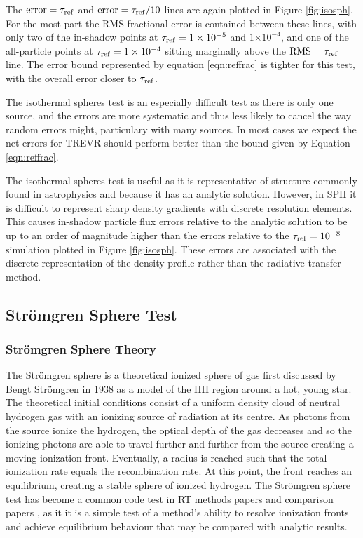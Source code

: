 \documentclass[fleq,usenatbib]{mnras}
\newcommand{\acro}{TREVR}
\providecommand{\e}[1]{\ensuremath{\times10^{#1}}}
\newcommand{\tr}{\tau_{\rm ref}}
\newcommand{\strom}{Str\"omgren}
\begin{document}
{The $\rm{error}=\tr$ and $\rm{error}=\tr/10$ lines are again plotted in Figure 
\ref{fig:isosph}. For the most part the RMS fractional error is contained 
between these lines, with only two of the in-shadow points at $\tr=1\e{-5}$ 
and $1\e{-4}$,  and one of the all-particle points at  $\tr=1\e{-4}$ sitting 
marginally above the $\rm{RMS}=\tr$ line.  The error bound represented by
equation 
\ref{eqn:reffrac} is tighter for this test, with the overall error
closer to $\tr$.

The isothermal spheres test is an especially difficult test as there 
is only one source, and the errors are more systematic and thus less likely
to cancel the way random errors might, particulary with many sources.
In most cases we expect the net errors for \acro{} should perform better than the bound
given by Equation \ref{eqn:reffrac}.

The isothermal spheres test is useful as it is representative of structure
commonly found in astrophysics and because it has an analytic solution. 
However, in SPH it is difficult to represent sharp density gradients with 
discrete resolution elements. This causes in-shadow particle flux errors relative 
to the analytic solution to be up to an order of magnitude higher than 
the errors relative to the $\tr = 10^{-8}$ simulation plotted in Figure 
\ref{fig:isosph}.  These errors are associated with the discrete representation
of the density profile rather than the radiative transfer method.

\subsection{\strom{} Sphere Test}
\subsubsection{\strom{} Sphere Theory}
The \strom{} sphere is a theoretical ionized sphere of gas first discussed by 
Bengt \strom{} in 1938 \citep{stromgren39} as a model of the HII region around 
a hot, young star. The theoretical initial conditions consist of a uniform 
density cloud of neutral hydrogen gas with an ionizing source of radiation at 
its centre. As photons from the source ionize the hydrogen, the optical depth 
of the gas decreases and so the ionizing photons are able to travel further 
and further from the source creating a moving ionization front.  Eventually,
a radius is reached such that the total ionization 
rate equals the recombination rate.  At this point, the front reaches an 
equilibrium, creating a stable sphere of ionized hydrogen. The \strom{} sphere 
test has become a common code test in RT methods papers \citep{pawlikSchaye08,
pawlikSchaye11, petkovaSpringel11} and comparison papers \citep{ilievEt06, 
ilievEt09}, as it it is a simple test of a method's ability to resolve 
ionization fronts and achieve equilibrium behaviour that may be compared with 
analytic results.

}
\end{document}
